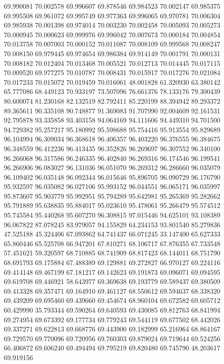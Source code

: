 69.990081
70.002578
69.996607
69.878546
69.984523
70.002147
69.985375
69.995508
69.961072
69.995749
69.977363
69.996065
69.970781
70.006304
69.985938
70.001398
69.974014
70.003230
70.002458
70.005093
70.005273
70.000945
70.000623
69.999976
69.996042
70.007673
70.000184
70.004854
70.013758
70.007003
70.000152
70.011087
70.008109
69.999568
70.008247
70.008150
69.979445
69.974654
69.986384
69.914149
70.001791
70.000131
70.008182
70.012404
70.013468
70.005521
70.012713
70.014445
70.017115
70.009520
69.977275
70.010787
70.008431
70.015917
70.017276
70.021084
70.017233
70.015072
70.019459
70.016061
48.001828
61.320930
63.380142
65.777086
68.449123
70.933197
73.507096
76.661376
78.133176
79.300439
80.600074
81.230168
82.132519
82.792411
85.220199
88.394942
89.293372
89.365611
90.335108
90.748877
91.369083
91.707990
92.004609
92.161531
92.795878
93.335858
93.403158
94.064169
94.111606
94.449310
94.701500
94.729382
95.257217
95.180992
95.598688
95.754416
95.913554
95.829689
96.104994
96.309034
96.368618
96.406357
96.403220
96.376555
96.384675
96.348559
96.412236
96.413435
96.352826
96.269697
96.307552
96.340100
96.266068
96.317586
96.246335
96.402840
96.269316
96.174546
96.199541
96.266906
96.083027
96.131036
96.051070
96.269312
96.286660
96.035079
96.109402
96.035148
96.092344
96.015646
95.896705
96.090729
96.176790
95.932597
96.035082
96.027106
95.993152
96.044551
96.065171
96.035997
95.873607
95.903779
95.992951
95.794289
95.642981
95.265369
95.282662
95.791889
95.638835
95.884017
95.023610
95.478061
95.266479
95.574512
95.745584
95.440268
95.607270
96.308815
97.015446
94.625101
93.108389
96.067822
87.078245
83.979057
94.155829
64.234153
93.801540
85.279836
47.525188
45.324406
67.093862
64.741437
66.071245
33.147400
65.627333
65.860446
65.525708
66.947201
67.810271
68.106717
67.876355
67.733548
57.451621
59.320597
68.710885
68.741909
68.817423
68.144011
68.751790
68.691793
69.175884
67.488389
69.129881
69.272827
66.970127
69.224116
69.414148
69.467199
67.181217
69.142623
69.191873
69.096071
69.094595
69.619708
69.446921
58.643977
69.369638
69.193779
69.589437
69.380509
69.413328
69.357471
69.164910
69.461127
68.550612
69.594637
68.338320
69.439209
69.695460
69.439660
69.454674
68.960104
69.672582
69.605712
60.429990
35.793344
69.590264
69.640593
69.430085
69.812763
68.841994
69.274954
69.673392
69.177734
69.779243
69.544119
69.677502
68.442026
69.337271
69.622813
69.668776
69.443900
69.182999
65.216964
68.864167
69.729570
69.770096
69.720956
69.760303
69.879024
69.719644
69.524256
66.406872
69.606240
69.494494
69.795219
69.820480
69.745790
48.203617
69.919156
